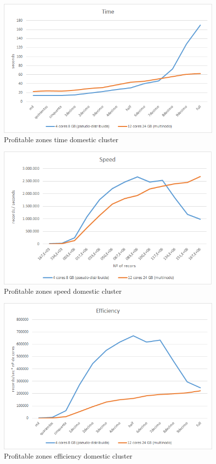 \begin{figure}[htp!]
	\centering
	\caption{Profitable zones time domestic cluster}
	\label{tprd}
	\vspace{5pt}
	\includegraphics[scale=0.8]{geng/tprd}
\end{figure}
\begin{figure}[htp!]
	\centering
	\caption{Profitable zones speed domestic cluster}
	\label{sprd}
	\vspace{5pt}
	\includegraphics[scale=0.85]{geng/sprd}
\end{figure}
\begin{figure}[htp!]
	\centering
	\caption{Profitable zones efficiency domestic cluster}
	\label{eprd}
	\vspace{5pt}
	\includegraphics[scale=0.85]{geng/eprd}
\end{figure}

